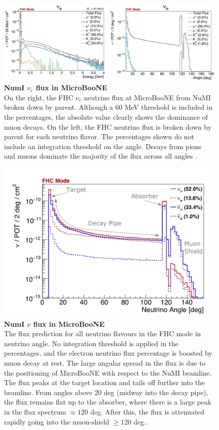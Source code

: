 \begin{figure}[h!]
    \centering
    \includegraphics[width=180mm]{Figures/numi_nue_flux.jpeg}
    \caption[NumI $\nu_e$ flux in MicroBooNE]{{\textbf{NumI $\nu_e$ flux in MicroBooNE}}\\ On the right, the FHC $\nu_e$ neutrino flux at MicroBooNE from NuMI broken down by parent. Although a 60 MeV threshold is included in the percentages, the absolute value clearly shows the dominance of muon decays. On the left, the FHC neutrino flux is broken down by parent for each neutrino flavor. The percentages shown do not include an integration threshold on the angle. Decays from pions and muons dominate the majority of the flux across all angles \cite{krish_phd}.}
    \label{numi_nue_flux}
\end{figure}

\begin{figure}[h!]
    \centering
    \includegraphics[width=130mm]{Figures/numi_nu_flux.jpeg}
    \caption[NumI $\nu$ flux in MicroBooNE]{{\textbf{NumI $\nu$ flux in MicroBooNE}}\\ The flux prediction for all neutrino flavours in the FHC mode in neutrino angle. No integration threshold is applied in the percentages, and the electron neutrino flux percentage is boosted by muon decay at rest. The large angular spread in the flux is due to the positioning of MicroBooNE with respect to the NuMI beamline. The flux peaks at the target location and tails off further into the beamline. From angles above $20$ deg (midway into the decay pipe), the flux remains flat up to the absorber, where there is a large peak in the flux spectrum $\approx 120$ deg. After this, the flux is attenuated rapidly going into the muon-shield $ \ge 120$ deg.\cite{krish_phd}.}
    \label{numi_nu_flux}
\end{figure}
\newpage

